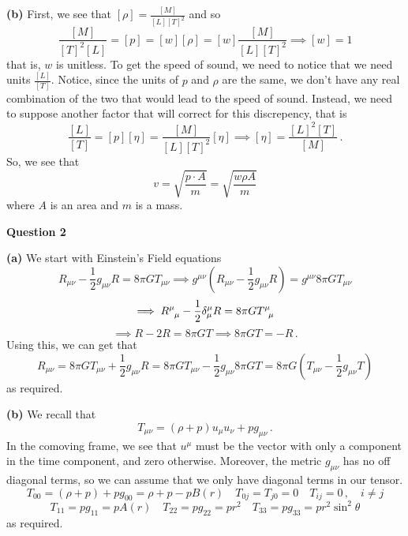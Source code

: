 \documentclass[10pt]{article}
\begin{document}
\textbf{(b)} First, we see that $[\rho] = \frac{[M]}{[L][T]^{2}}$ and so
\[ \frac{[M]}{[T]^{2}[L]} = [p] = [w][\rho] = [w]\frac{[M]}{[L][T]^{2}} \implies [w] = 1 \]
that is, $w$ is unitless. To get the speed of sound, we need to notice that we need units $\frac{[L]}{[T]}$. Notice, since the units of $p$ and $\rho$ are the same, we don't have any real combination of the two that would lead to the speed of sound. Instead, we need to suppose another factor that will correct for this discrepency, that is
\[ \frac{[L]}{[T]} = [p][\eta] = \frac{[M]}{[L][T]^{2}}[\eta] \implies [\eta] = \frac{[L]^{2}[T]}{[M]} \, .\]
So, we see that
\[ v = \sqrt{\frac{p \cdot A}{m}} = \sqrt{\frac{w\rho A}{m}}\]
where $A$ is an area and $m$ is a mass.


\newpage
\textbf{Question 2}

\textbf{(a)} We start with Einstein's Field equations
\[ R_{\mu\nu} - \frac{1}{2}g_{\mu\nu}R = 8\pi GT_{\mu\nu} \implies g^{\mu\nu}\left(R_{\mu\nu} - \frac{1}{2}g_{\mu\nu}R\right) =g^{\mu\nu}8\pi GT_{\mu\nu}\]
\[ \implies \tensor{R}{^{\mu}_{\mu}} - \frac{1}{2}\delta^{\mu}_{\mu}R = 8\pi G\tensor{T}{^{\mu}_{\mu}} \]
\[ \implies R - 2R = 8\pi GT \implies 8\pi GT = -R \, .\]
Using this, we can get that
\[ R_{\mu\nu} = 8\pi GT_{\mu\nu} + \frac{1}{2}g_{\mu\nu}R= 8\pi GT_{\mu\nu} -\frac{1}{2}g_{\mu\nu}8\pi GT = 8\pi G\left(T_{\mu\nu} - \frac{1}{2}g_{\mu\nu}T\right) \]
as required.

\textbf{(b)} We recall that
\[ T_{\mu\nu} = (\rho + p)u_{\mu}u_{\nu} + pg_{\mu\nu} \, .\]
In the comoving frame, we see that $u^{\mu}$ must be the vector with only a component in the time component, and zero otherwise. Moreover, the metric $g_{\mu\nu}$ has no off diagonal terms, so we can assume that we only have diagonal terms in our tensor.
\[ T_{00} = (\rho + p) + pg_{00} = \rho + p - pB(r) \quad T_{0j}=T_{j0} = 0 \quad T_{ij} = 0\, , \quad  i\neq j\]
\[ T_{11} = pg_{11} = pA(r) \quad T_{22} = pg_{22} = pr^{2} \quad T_{33} = pg_{33} = pr^{2}\sin^{2}\theta \]
as required.
\end{document}

